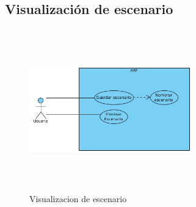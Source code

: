 \begin{enumerate}[1.]
\subsection{Visualización de escenario} 
\vspace{5mm} 
\begin{figure}[h!]
	\centering
	\includegraphics[width=7cm,height=7cm]{imagenes/analisis/Escenario.jpg}
	\caption{Visualizacion de escenario \cite{B27}}
	\label{fig:analogo}
\end{figure}
\end{enumerate}